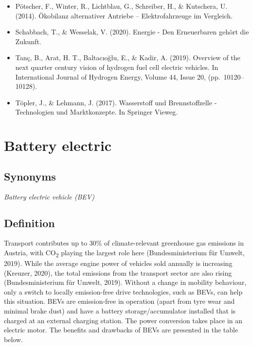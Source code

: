 \documentclass[
]{book}
\begin{document}
\begin{itemize}
\item
  Pötscher, F., Winter, R., Lichtblau, G., Schreiber, H., \& Kutschera, U. (2014). Ökobilanz alternativer Antriebe -- Elektrofahrzeuge im Vergleich.
\item
  Schabbach, T., \& Wesselak, V. (2020). Energie - Den Erneuerbaren gehört die Zukunft.
\item
  Tanç, B., Arat, H. T., Baltacıoğlu, E., \& Kadir, A. (2019). Overview of the next quarter century vision of hydrogen fuel cell electric vehicles. In International Journal of Hydrogen Energy, Volume 44, Issue 20, (pp.~10120--10128).
\item
  Töpler, J., \& Lehmann, J. (2017). Wasserstoff und Brennstoffzelle - Technologien und Marktkonzepte. In Springer Vieweg.
\end{itemize}

\hypertarget{bev}{%
\section{Battery electric}\label{bev}}

\hypertarget{synonyms-44}{%
\subsection*{Synonyms}\label{synonyms-44}}

\emph{Battery electric vehicle (BEV)}

\hypertarget{definition-47}{%
\subsection*{Definition}\label{definition-47}}

Transport contributes up to 30\% of climate-relevant greenhouse gas emissions in Austria, with CO\textsubscript{2} playing the largest role here (Bundesministerium für Umwelt, 2019). While the average engine power of vehicles sold annually is increasing (Kreuzer, 2020), the total emissions from the transport sector are also rising (Bundesministerium für Umwelt, 2019). Without a change in mobility behaviour, only a switch to locally emission-free drive technologies, such as BEVs, can help this situation. BEVs are emission-free in operation (apart from tyre wear and minimal brake dust) and have a battery storage/accumulator installed that is charged at an external charging station. The power conversion takes place in an electric motor. The benefits and drawbacks of BEVs are presented in the table below.
\end{document}
